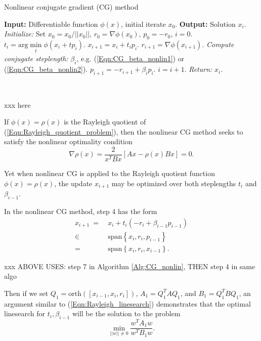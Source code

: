 \begin{enumerate}
\begin{algorithm}[H]
\caption{Nonlinear conjugate gradient (CG) method}	\label{Alg:CG_nonlin}

\begin{algorithmic}[1]
	\Statex		\textbf{Input:} Differentiable function $\phi(x)$, initial iterate $x_0$.
	\Statex 	\textbf{Output:} Solution $x_i$.
	\State		\textit{Initialize:} Set $x_0 = x_0 / ||x_0||$, $r_0 = \nabla \phi (x_0)$, $p_0 = -r_0$, $i = 0$.
		\State	$t_i = \text{arg}\min\limits_{\substack{t}} \phi(x_i + t p_i)$.
		\State	$x_{i+1} = x_i + t_i p_i$.
		\State	$r_{i+1} = \nabla \phi(x_{i+1})$.
		\State	\textit{Compute conjugate steplength:} $\beta_i$, e.g. (\ref{Eqn:CG_beta_nonlin1}) or (\ref{Eqn:CG_beta_nonlin2}).
		\State	$p_{i+1} = -r_{i+1} + \beta_ip_i$.
		\State 	$i = i + 1$.
	\EndWhile
	\State		\textit{Return:} $x_i$.
\end{algorithmic}

\end{algorithm}

\


xxx here

If $\phi(x) = \rho(x)$ is the Rayleigh quotient of (\ref{Eqn:Rayleigh_quotient_problem}), then the nonlinear CG method seeks to satisfy the nonlinear optimality condition 
\begin{equation}
\nabla \rho(x) = \frac{2}{x^TBx}\left[Ax - \rho(x) Bx \right] = 0.
\end{equation}


Yet when nonlinear CG is applied to the Rayleigh quotient function $\phi(x) = \rho(x)$, the update $x_{i+1}$ may be optimized over both steplengths $t_i$ and $\beta_{i-1}$.  

In the nonlinear CG method, step 4 has the form
\begin{equation}			\label{Eqn:LOCG_spans_optimal_step}
\begin{split}
x_{i+1} \ = 
	& \	x_{i} + t_{i} \left( -r_{i} + \beta_{i-1} p_{i-1} \right) \\
	\in \	&	 \ \text{span} \left\{	x_{i}, r_{i}, p_{i-1}	\right\} 		\\
	= \ 	&	 \ \text{span} \left\{	x_{i}, r_{i}, x_{i-1}	\right\}.
\end{split}
\end{equation}

xxx ABOVE USES: step 7 in Algorithm \ref{Alg:CG_nonlin}, THEN step 4 in same algo

Then if we set $Q_1 = \text{orth}([x_{i-1}, x_i, r_i])$, $A_1 = Q_1^TAQ_1$, and $B_1 = Q_1^TBQ_1$, an argument similar to (\ref{Eqn:Rayleigh_linesearch}) demonstrates that the optimal linesearch for $t_i, \beta_{i-1}$ will be the solution to the problem
\begin{equation}
\min\limits_{||w|| \neq 0} \frac{w^TA_1w}{w^T B_1 w}.
\end{equation}



\end{enumerate}
